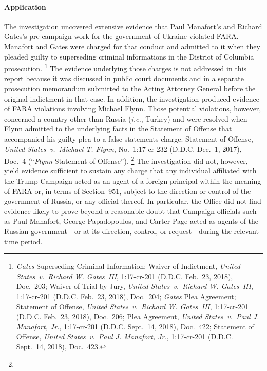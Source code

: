 \paragraph{Application}
The investigation uncovered extensive evidence that Paul Manafort's and Richard Gates's pre-campaign work for the government of Ukraine violated FARA\null.
Manafort and Gates were charged for that conduct and admitted to it when they pleaded guilty to superseding criminal informations in the District of Columbia prosecution.%
\footnote{\textit{Gates} Superseding Criminal Information;
Waiver of Indictment, \textit{United States~v.\ Richard W. Gates~III}, 1:17-cr-201 (D.D.C. Feb.~23, 2018), Doc.~203;
Waiver of Trial by Jury, \textit{United States~v.\ Richard W. Gates~III}, 1:17-cr-201 (D.D.C. Feb.~23, 2018), Doc.~204;
\textit{Gates} Plea Agreement;
Statement of Offense, \textit{United States~v.\ Richard W. Gates~III}, 1:17-cr-201 (D.D.C. Feb.~23, 2018), Doc.~206;
Plea Agreement, \textit{United States~v.\ Paul J. Manafort, Jr.}, 1:17-cr-201 (D.D.C. Sept.~14, 2018), Doc.~422;
Statement of Offense, \textit{United States~v.\ Paul J. Manafort, Jr.}, 1:17-cr-201 (D.D.C. Sept.~14, 2018), Doc.~423.}
The evidence underlying those charges is not addressed in this report because it was discussed in public court documents and in a separate prosecution memorandum submitted to the Acting Attorney General before the original indictment in that case.
In addition, the investigation produced evidence of FARA violations involving Michael Flynn.
Those potential violations, however, concerned a country other than Russia (\textit{i.e.}, Turkey) and were resolved when Flynn admitted to the underlying facts in the Statement of Offense that accompanied his guilty plea to a false-statements charge.
Statement of Offense, \textit{United States~v.\ Michael T. Flynn}, No.~1:17-cr-232 (D.D.C. Dec.~1, 2017), Doc.~4 (``\textit{Flynn} Statement of Offense'').%
\footnote{}
The investigation did not, however, yield evidence sufficient to sustain any charge that any individual affiliated with the Trump Campaign acted as an agent of a foreign principal within the meaning of FARA or, in terms of Section~951, subject to the direction or control of the government of Russia, or any official thereof.
In particular, the Office did not find evidence likely to prove beyond a reasonable doubt that Campaign officials such as Paul Manafort, George Papadopoulos, and Carter Page acted as agents of the Russian government---or at its direction, control, or request---during the relevant time period.%
